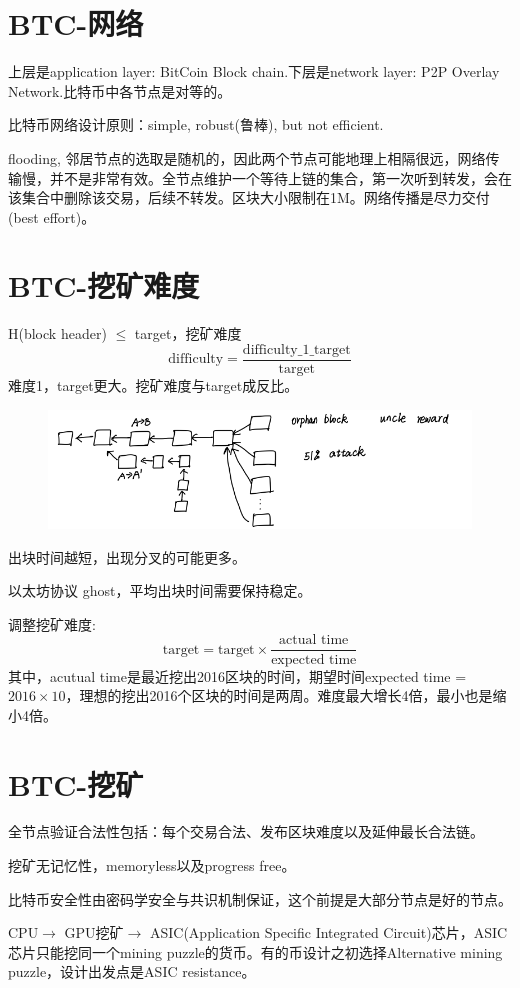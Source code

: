 \documentclass[10pt]{ctexart}
\begin{document}
\section{BTC-网络}
上层是application layer: BitCoin Block chain.下层是network layer: P2P Overlay Network.比特币中各节点是对等的。

比特币网络设计原则：simple, robust(鲁棒), but not efficient.

flooding, 邻居节点的选取是随机的，因此两个节点可能地理上相隔很远，网络传输慢，并不是非常有效。全节点维护一个等待上链的集合，第一次听到转发，会在该集合中删除该交易，后续不转发。区块大小限制在1M。网络传播是尽力交付(best effort)。

\section{BTC-挖矿难度}
H(block header) $\le$ target，挖矿难度
$$
\text{difficulty} = \frac{\text{difficulty\_1\_target}}{\text{target}}
$$
难度1，target更大。挖矿难度与target成反比。
\begin{figure}[H]
    \centering
    \includegraphics[width=1\textwidth]{./lecture7/img1.png} 
\end{figure}
出块时间越短，出现分叉的可能更多。

以太坊协议 ghost，平均出块时间需要保持稳定。

调整挖矿难度:
$$
\text{target} = \text{target} \times \frac{\text{actual time}}{\text{expected time}}
$$
其中，acutual time是最近挖出2016区块的时间，期望时间expected time = $2016 \times 10$，理想的挖出2016个区块的时间是两周。难度最大增长4倍，最小也是缩小4倍。
 
\section{BTC-挖矿}
全节点验证合法性包括：每个交易合法、发布区块难度以及延伸最长合法链。

挖矿无记忆性，memoryless以及progress free。

比特币安全性由密码学安全与共识机制保证，这个前提是大部分节点是好的节点。

CPU$\rightarrow$ GPU挖矿$\rightarrow$ ASIC(Application Specific Integrated Circuit)芯片，ASIC芯片只能挖同一个mining puzzle的货币。有的币设计之初选择Alternative mining puzzle，设计出发点是ASIC resistance。
\end{document}
